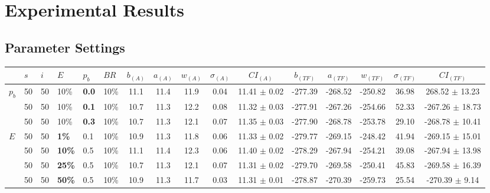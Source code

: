 \chapter{Experimental Results}
\label{appendixC}

\section{Parameter Settings}

\begin{sidewaystable}
    \hspace*{-0.7cm}
    \begin{tabular}{|l|l|l|l|l|l||c|c|c|c|c|c|c|c|c|c|}
    \hline
    ~ & $s$ & $i$ & $E$ & $p_{b}$ & $BR$ & $b_{(A)}$ & $a_{(A)}$ & $w_{(A)}$ & $\sigma_{(A)}$ & $CI_{(A)}$ & $b_{(TF)}$ & $a_{(TF)}$ & $w_{(TF)}$ & $\sigma_{(TF)}$ & $CI_{(TF)}$\\
    \hline
    $p_{b}$ & 50 & 50 & 10\% & \textbf{0.0} & 10\% & 11.1 & 11.4 & 11.9 & 0.04 & 11.41 $\pm$ 0.02 & -277.39 & -268.52 & -250.82 & 36.98 & 268.52 $\pm$ 13.23 \\
    ~ & 50 & 50 & 10\% & \textbf{0.1} & 10\% & 10.7 & 11.3 & 12.2 & 0.08 & 11.32 $\pm$ 0.03 & -277.91 & -267.26 & -254.66 & 52.33 & -267.26 $\pm$ 18.73 \\
    ~ & 50 & 50 & 10\% & \textbf{0.3} & 10\% & 10.7 & 11.3 & 12.1 & 0.07 & 11.35 $\pm$ 0.03 & -277.90 & -268.78 & -253.78 & 29.10 & -268.78 $\pm$ 10.41 \\
    \hline
    \hline
    $E$ & 50 & 50 & \textbf{1\%} & 0.1 & 10\% & 10.9 & 11.3 & 11.8 & 0.06 & 11.33 $\pm$ 0.02 & -279.77 & -269.15 & -248.42 & 41.94 & -269.15 $\pm$ 15.01 \\
    ~ & 50 & 50 & \textbf{10\%} & 0.5 & 10\% & 11.1 & 11.4 & 12.3 & 0.06 & 11.40 $\pm$ 0.02 & -278.29 & -267.94 & -254.21 & 39.08 & -267.94 $\pm$ 13.98 \\
    ~ & 50 & 50 & \textbf{25\%} & 0.5 & 10\% & 10.7 & 11.3 & 12.1 & 0.07 & 11.31 $\pm$ 0.02 & -279.70 & -269.58 & -250.41 & 45.83 & -269.58 $\pm$ 16.39 \\
    ~ & 50 & 50 & \textbf{50\%} & 0.5 & 10\% & 10.9 & 11.3 & 11.7 & 0.03 & 11.31 $\pm$ 0.01 & -278.87 & -270.39 & -259.73 & 25.54 & -270.39 $\pm$ 9.14 \\

\end{tabular}
\end{sidewaystable}
